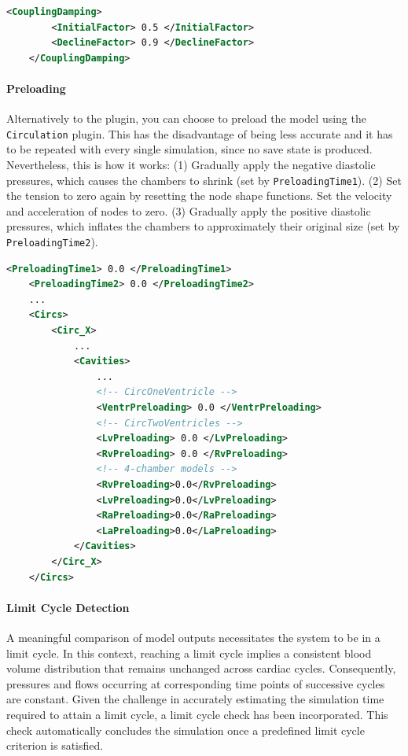 \begin{lstlisting}[language=XML,caption=.xml settings for the coupling damping of the circulation plugin (subkeys of <Circulation>)]
    <CouplingDamping>
        <InitialFactor> 0.5 </InitialFactor>
        <DeclineFactor> 0.9 </DeclineFactor>
    </CouplingDamping>

\end{lstlisting}

\paragraph{Preloading} Alternatively to the  plugin, you can choose to preload the model using the \verb|Circulation| plugin.
This has the disadvantage of being less accurate and it has to be repeated with every single simulation, since no save state is produced.
Nevertheless, this is how it works:
(1) Gradually apply the negative diastolic pressures, which causes the chambers to shrink (set by \verb|PreloadingTime1|).
(2) Set the tension to zero again by resetting the node shape functions. 
Set the velocity and acceleration of nodes to zero. 
(3) Gradually apply the positive diastolic pressures, which inflates the chambers to
approximately their original size (set by \verb|PreloadingTime2|).

\begin{lstlisting}[language=XML,caption=.xml settings for the preloading procedure of the circulation plugin (subkeys of <Circulation>)]
    <PreloadingTime1> 0.0 </PreloadingTime1>
    <PreloadingTime2> 0.0 </PreloadingTime2>
    ...
    <Circs>
        <Circ_X>
            ...
            <Cavities>
                ...
                <!-- CircOneVentricle -->
                <VentrPreloading> 0.0 </VentrPreloading>
                <!-- CircTwoVentricles -->
                <LvPreloading> 0.0 </LvPreloading>
                <RvPreloading> 0.0 </RvPreloading>
                <!-- 4-chamber models -->
                <RvPreloading>0.0</RvPreloading>
                <LvPreloading>0.0</LvPreloading>
                <RaPreloading>0.0</RaPreloading>
                <LaPreloading>0.0</LaPreloading>
            </Cavities>
        </Circ_X>
    </Circs>
\end{lstlisting}

\paragraph{Limit Cycle Detection} A meaningful comparison of model outputs necessitates the system to be in a limit cycle. 
In this context, reaching a limit cycle implies a consistent blood volume distribution that remains unchanged across cardiac cycles. 
Consequently, pressures and flows occurring at corresponding time points of successive cycles are constant. 
Given the challenge in accurately estimating the simulation time required to attain a limit cycle, a limit cycle check has been incorporated. 
This check automatically concludes the simulation once a predefined limit cycle criterion is satisfied.

